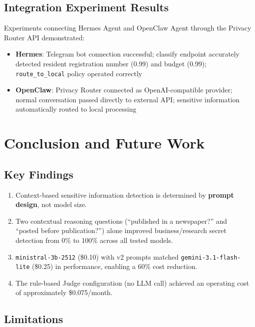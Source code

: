 \documentclass[11pt,a4paper]{article}
\begin{document}
\subsection{Integration Experiment Results}

Experiments connecting Hermes Agent and OpenClaw Agent through the Privacy Router API demonstrated:

\begin{itemize}[nosep]
  \item \textbf{Hermes}: Telegram bot connection successful; classify endpoint accurately detected resident registration number (0.99) and budget (0.99); \texttt{route\_to_local} policy operated correctly
  \item \textbf{OpenClaw}: Privacy Router connected as OpenAI-compatible provider; normal conversation passed directly to external API; sensitive information automatically routed to local processing
\end{itemize}

\section{Conclusion and Future Work}

\subsection{Key Findings}

\begin{enumerate}[nosep]
  \item Context-based sensitive information detection is determined by \textbf{prompt design}, not model size.
  \item Two contextual reasoning questions (``published in a newspaper?'' and ``posted before publication?'') alone improved business/research secret detection from 0\% to 100\% across all tested models.
  \item \texttt{ministral-3b-2512} (\$0.10) with v2 prompts matched \texttt{gemini-3.1-flash-lite} (\$0.25) in performance, enabling a 60\% cost reduction.
  \item The rule-based Judge configuration (no LLM call) achieved an operating cost of approximately \$0.075/month.
\end{enumerate}

\subsection{Limitations}
\end{document}
